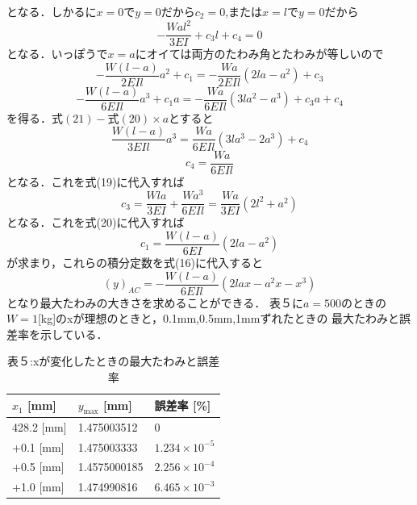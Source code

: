 \documentclass[a4paper,12pt]{jsarticle}
\begin{document}
\begin{enumerate}
\begin{equation}
\end{equation}
となる．しかるに$x=0$で$y=0$だから$c_2=0$,または$x=l$で$y=0$だから
\begin{equation} 
  {-\dfrac{Wal^2}{3EI}+c_3l+c_4}=0
\end{equation}
となる．いっぽうで$x=a$にオイては両方のたわみ角とたわみが等しいので
\begin{equation} 
  {-\dfrac{W(l-a)}{2EIl}a^2+c_1}={-\dfrac{Wa}{2EIl}(2la-a^2)+c_3}
\end{equation}
\begin{equation} 
  {-\dfrac{W(l-a)}{6EIl}a^3+c_1a}={-\dfrac{Wa}{6EIl}(3la^2-a^3)+c_3a+c_4}
\end{equation}
を得る．$式(21)-式(20) \times a$とすると
\begin{equation} 
  {\dfrac{W(l-a)}{3EIl}a^3}={\dfrac{Wa}{6EIl}(3la^3-2a^3)+c_4}
\end{equation}
\begin{equation} 
  c_4={\dfrac{Wa}{6EIl}}
\end{equation}
となる．これを式(19)に代入すれば
\begin{equation} 
  c_3={\dfrac{Wla}{3EI}+\dfrac{Wa^3}{6EIl}}={\dfrac{Wa}{3EI}(2l^2+a^2)}
\end{equation}
となる．これを式(20)に代入すれば
\begin{equation} 
  c_1={\dfrac{W(l-a)}{6EI}(2la-a^2)}
\end{equation}
が求まり，これらの積分定数を式(16)に代入すると
\begin{equation} 
  {(y)_{AC}}={-\dfrac{W(l-a)}{6EIl}(2lax-a^2x-x^3)}
\end{equation}
となり最大たわみの大きさを求めることができる．
表５に$a=500$のときの$W=1$[kg]のxが理想のときと，0.1mm,0.5mm,1mmずれたときの
最大たわみと誤差率を示している．\\
\begin{table}[h]
  \centering
  \caption*{表５:xが変化したときの最大たわみと誤差率}
  \label{tab:表５}
  \large
  \begin{tabular}{|p{3cm}|p{3cm}|p{4cm}|}
      \hline
      $x_1$ [mm] & $y_{\text{max}}$ [mm] & 誤差率 [\%] \\\hline
      428.2 [mm] & 1.475003512 & 0 \\\hline
      +0.1 [mm] & 1.475003333 & $1.234 \times 10^{-5}$ \\\hline
      +0.5 [mm] & 1.4575000185 & $2.256 \times 10^{-4}$ \\\hline
      +1.0 [mm] & 1.474990816 & $6.465 \times 10^{-3}$ \\\hline

\end{tabular}
\end{table}
\end{enumerate}
\end{document}
